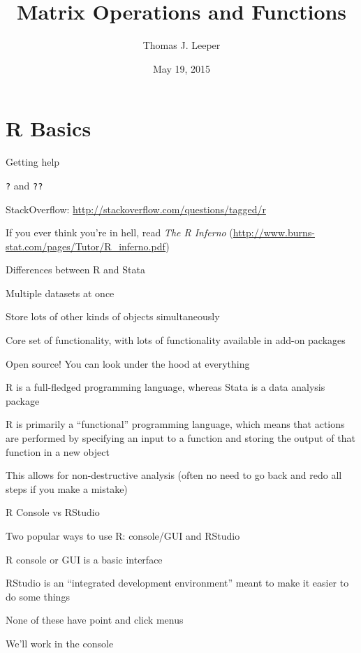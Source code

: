 \documentclass[a4paper,12pt]{article}
\title{Matrix Operations and Functions}
\author{Thomas J. Leeper}
\date{May 19, 2015}
\begin{document}
\maketitle

\doublespacing

\section{R Basics}



Getting help

\begin{itemize*}
\item \texttt{?} and \texttt{??}
\item StackOverflow: \url{http://stackoverflow.com/questions/tagged/r}
\item If you ever think you're in hell, read \textit{The R Inferno} (\url{http://www.burns-stat.com/pages/Tutor/R_inferno.pdf})
\end{itemize*}


Differences between R and Stata

\begin{itemize*}
\item Multiple datasets at once
\item Store lots of other kinds of objects simultaneously
\item Core set of functionality, with lots of functionality available in add-on packages
\item Open source! You can look under the hood at everything
\item R is a full-fledged programming language, whereas Stata is a data analysis package
\item R is primarily a ``functional'' programming language, which means that actions are performed by specifying an input to a function and storing the output of that function in a new object
\item This allows for non-destructive analysis (often no need to go back and redo all steps if you make a mistake)
\end{itemize*}


R Console vs RStudio

\begin{itemize*}
\item Two popular ways to use R: console/GUI and RStudio
\item R console or GUI is a basic interface
\item RStudio is an ``integrated development environment'' meant to make it easier to do some things
\item None of these have point and click menus
\item We'll work in the console
\end{itemize*}
\end{document}
